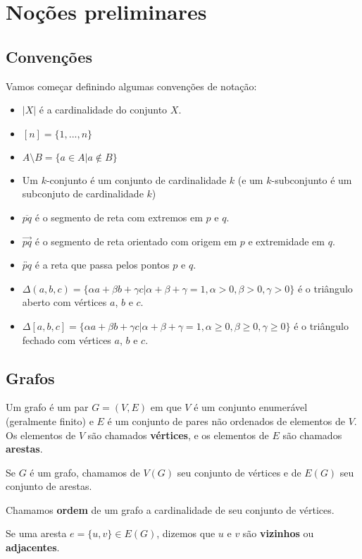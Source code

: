 \documentclass[a4paper]{book}
\begin{document}
\chapter{Noções preliminares}
\section{Convenções}
Vamos começar definindo algumas convenções de notação:
\begin{itemize}
    \item $|X|$ é a cardinalidade do conjunto $X$.
    \item $[n]=\{1,...,n\}$
    \item $A\setminus B = \{a\in A|a\notin B\}$
    \item Um $k$-conjunto é um conjunto de cardinalidade $k$ (e um $k$-subconjunto é um subconjuto de cardinalidade $k$)
    \item $\overline{pq}$ é o segmento de reta com extremos em $p$ e $q$.
    \item $\overrightarrow{pq}$ é o segmento de reta orientado com origem em $p$ e extremidade em $q$.
    \item $\overleftrightarrow{pq}$ é a reta que passa pelos pontos $p$ e $q$.
    \item $\Delta(a,b,c)=\{\alpha a+\beta b+\gamma c|\alpha+\beta+\gamma=1, \alpha>0, \beta>0, \gamma>0\}$ é o triângulo aberto com vértices $a$, $b$ e $c$.
    \item $\Delta[a,b,c]=\{\alpha a+\beta b+\gamma c|\alpha+\beta+\gamma=1, \alpha\geq0, \beta\geq0, \gamma\geq0\}$ é o triângulo fechado com vértices $a$, $b$ e $c$.
\end{itemize}

\section{Grafos}
Um grafo é um par $G=(V,E)$ em que $V$ é um conjunto enumerável (geralmente finito) e $E$ é um conjunto de pares não ordenados de elementos de $V$. Os elementos de $V$ são chamados \textbf{vértices}, e os elementos de $E$ são chamados \textbf{arestas}.

Se $G$ é um grafo, chamamos de $V(G)$ seu conjunto de vértices e de $E(G)$ seu conjunto de arestas.

Chamamos \textbf{ordem} de um grafo a cardinalidade de seu conjunto de vértices.

Se uma aresta $e=\{u,v\}\in E(G)$, dizemos que $u$ e $v$ são \textbf{vizinhos} ou \textbf{adjacentes}.
\end{document}
